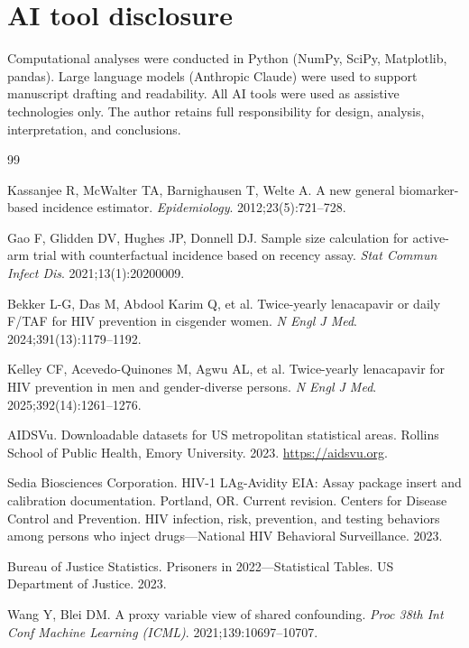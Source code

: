 \documentclass[12pt]{article}
\begin{document}
\section*{AI tool disclosure}

Computational analyses were conducted in Python (NumPy, SciPy, Matplotlib, pandas). Large language models (Anthropic Claude) were used to support manuscript drafting and readability. All AI tools were used as assistive technologies only. The author retains full responsibility for design, analysis, interpretation, and conclusions.


\begin{thebibliography}{99}

 Kassanjee R, McWalter TA, Barnighausen T, Welte A. A new general biomarker-based incidence estimator. \textit{Epidemiology}. 2012;23(5):721--728.

 Gao F, Glidden DV, Hughes JP, Donnell DJ. Sample size calculation for active-arm trial with counterfactual incidence based on recency assay. \textit{Stat Commun Infect Dis}. 2021;13(1):20200009.

 Bekker L-G, Das M, Abdool Karim Q, et al. Twice-yearly lenacapavir or daily F/TAF for HIV prevention in cisgender women. \textit{N Engl J Med}. 2024;391(13):1179--1192.

 Kelley CF, Acevedo-Quinones M, Agwu AL, et al. Twice-yearly lenacapavir for HIV prevention in men and gender-diverse persons. \textit{N Engl J Med}. 2025;392(14):1261--1276.

 AIDSVu. Downloadable datasets for US metropolitan statistical areas. Rollins School of Public Health, Emory University. 2023. \url{https://aidsvu.org}.

 Sedia Biosciences Corporation. HIV-1 LAg-Avidity EIA: Assay package insert and calibration documentation. Portland, OR. Current revision.
 Centers for Disease Control and Prevention. HIV infection, risk, prevention, and testing behaviors among persons who inject drugs---National HIV Behavioral Surveillance. 2023.

 Bureau of Justice Statistics. Prisoners in 2022---Statistical Tables. US Department of Justice. 2023.

 Wang Y, Blei DM. A proxy variable view of shared confounding. \textit{Proc 38th Int Conf Machine Learning (ICML)}. 2021;139:10697--10707.


\end{thebibliography}
\end{document}
